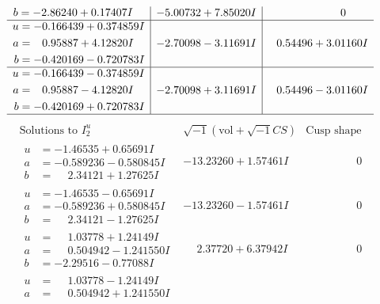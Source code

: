 \documentclass[1p]{elsarticle_modified}
\theoremstyle{definition}
\newcommand{\I}{\sqrt{-1}}
\begin{document}
$$\begin{array}{c|c|c}
\begin{aligned}
b &= -2.86240 + 0.17407 I\end{aligned}
 & -5.00732 + 7.85020 I & \phantom{-0.000000 } 0 \\ \hline\begin{aligned}
u &= -0.166439 + 0.374859 I \\
a &= \phantom{-}0.95887 + 4.12820 I \\
b &= -0.420169 - 0.720783 I\end{aligned}
 & -2.70098 - 3.11691 I & \phantom{-}0.54496 + 3.01160 I \\ \hline\begin{aligned}
u &= -0.166439 - 0.374859 I \\
a &= \phantom{-}0.95887 - 4.12820 I \\
b &= -0.420169 + 0.720783 I\end{aligned}
 & -2.70098 + 3.11691 I & \phantom{-}0.54496 - 3.01160 I\\
 \hline 
 \end{array}$$\newpage$$\begin{array}{c|c|c}  
\text{Solutions to }I^u_{2}& \I (\text{vol} + \sqrt{-1}CS) & \text{Cusp shape}\\
 \hline 
\begin{aligned}
u &= -1.46535 + 0.65691 I \\
a &= -0.589236 - 0.580845 I \\
b &= \phantom{-}2.34121 + 1.27625 I\end{aligned}
 & -13.23260 + 1.57461 I & \phantom{-0.000000 } 0 \\ \hline\begin{aligned}
u &= -1.46535 - 0.65691 I \\
a &= -0.589236 + 0.580845 I \\
b &= \phantom{-}2.34121 - 1.27625 I\end{aligned}
 & -13.23260 - 1.57461 I & \phantom{-0.000000 } 0 \\ \hline\begin{aligned}
u &= \phantom{-}1.03778 + 1.24149 I \\
a &= \phantom{-}0.504942 - 1.241550 I \\
b &= -2.29516 - 0.77088 I\end{aligned}
 & \phantom{-}2.37720 + 6.37942 I & \phantom{-0.000000 } 0 \\ \hline\begin{aligned}
u &= \phantom{-}1.03778 - 1.24149 I \\
a &= \phantom{-}0.504942 + 1.241550 I \\

\end{aligned}
\end{array}$$
\end{document}
